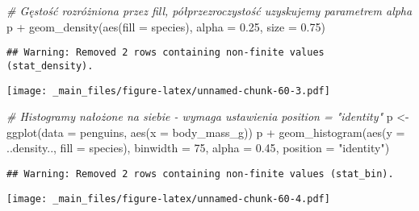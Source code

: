 \documentclass[
]{book}
\newenvironment{Shaded}{\begin{snugshade}}{\end{snugshade}}
\newcommand{\AttributeTok}[1]{\textcolor[rgb]{0.77,0.63,0.00}{#1}}
\newcommand{\CommentTok}[1]{\textcolor[rgb]{0.56,0.35,0.01}{\textit{#1}}}
\newcommand{\DecValTok}[1]{\textcolor[rgb]{0.00,0.00,0.81}{#1}}
\newcommand{\FloatTok}[1]{\textcolor[rgb]{0.00,0.00,0.81}{#1}}
\newcommand{\FunctionTok}[1]{\textcolor[rgb]{0.00,0.00,0.00}{#1}}
\newcommand{\NormalTok}[1]{#1}
\newcommand{\OtherTok}[1]{\textcolor[rgb]{0.56,0.35,0.01}{#1}}
\newcommand{\SpecialCharTok}[1]{\textcolor[rgb]{0.00,0.00,0.00}{#1}}
\newcommand{\StringTok}[1]{\textcolor[rgb]{0.31,0.60,0.02}{#1}}
\begin{document}
\begin{Shaded}
\begin{Highlighting}[]
\CommentTok{\# Gęstość rozróżniona przez fill, półprzezroczystość uzyskujemy parametrem alpha}
\NormalTok{p }\SpecialCharTok{+} \FunctionTok{geom\_density}\NormalTok{(}\FunctionTok{aes}\NormalTok{(}\AttributeTok{fill =}\NormalTok{ species), }\AttributeTok{alpha =} \FloatTok{0.25}\NormalTok{, }\AttributeTok{size =} \FloatTok{0.75}\NormalTok{)}
\end{Highlighting}
\end{Shaded}

\begin{verbatim}
## Warning: Removed 2 rows containing non-finite values (stat_density).
\end{verbatim}

\texttt{[image: \_main\_files/figure-latex/unnamed-chunk-60-3.pdf]}

\begin{Shaded}
\begin{Highlighting}[]
\CommentTok{\# Histogramy nałożone na siebie {-} wymaga ustawienia position = "identity"}
\NormalTok{p }\OtherTok{\textless{}{-}} \FunctionTok{ggplot}\NormalTok{(}\AttributeTok{data =}\NormalTok{ penguins, }\FunctionTok{aes}\NormalTok{(}\AttributeTok{x =}\NormalTok{ body\_mass\_g))}
\NormalTok{p }\SpecialCharTok{+} \FunctionTok{geom\_histogram}\NormalTok{(}\FunctionTok{aes}\NormalTok{(}\AttributeTok{y =}\NormalTok{ ..density.., }\AttributeTok{fill =}\NormalTok{ species), }\AttributeTok{binwidth =} \DecValTok{75}\NormalTok{, }\AttributeTok{alpha =} \FloatTok{0.45}\NormalTok{, }\AttributeTok{position =} \StringTok{"identity"}\NormalTok{)}
\end{Highlighting}
\end{Shaded}

\begin{verbatim}
## Warning: Removed 2 rows containing non-finite values (stat_bin).
\end{verbatim}

\texttt{[image: \_main\_files/figure-latex/unnamed-chunk-60-4.pdf]}
\end{document}
